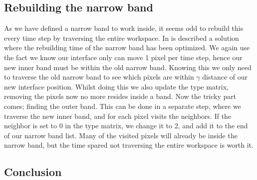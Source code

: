 \subsection{Rebuilding the narrow band}
As we have defined a narrow band to work inside, it seems odd to
rebuild this every time step by traversing the entire
workspace. In  is described a solution where the
rebuilding time of the narrow band has been optimized. We again use
the fact we know our interface only can move 1 pixel per time step,
hence our new inner band must be within the old narrow band. Knowing
this we only need to traverse the old narrow band to see which pixels
are within $\gamma$ distance of our new interface position. Whilst
doing this we also update the type matrix, removing the pixels now no
more resides inside a band. Now the tricky part comes; finding the
outer band. This can be done in a separate step, where we traverse the
new inner band, and for each pixel visits the neighbors. If the
neighbor is set to 0 in the type matrix, we change it to 2, and add it
to the end of our narrow band list. Many of the visited pixels will
already be inside the narrow band, but the time spared not traversing
the entire workspace is worth it. 





\subsection{Conclusion}
